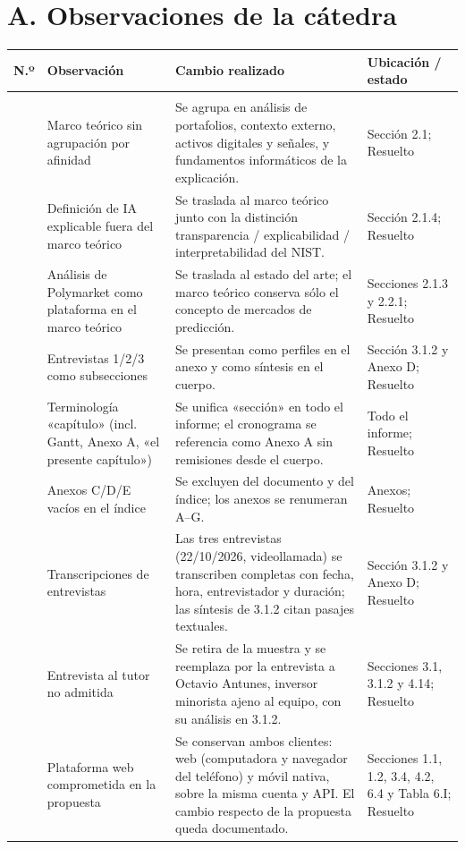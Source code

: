 \documentclass[a4paper,11pt]{article}
\newcommand{\ok}{\textcolor{green!45!black}{Resuelto}}
\begin{document}
\section*{A. Observaciones de la cátedra}
\small
\begin{longtable}{>{\raggedright\arraybackslash}p{0.6cm}>{\raggedright\arraybackslash}p{5.2cm}>{\raggedright\arraybackslash}p{7.3cm}>{\raggedright\arraybackslash}p{3.4cm}}
\toprule
\textbf{N.º} & \textbf{Observación} & \textbf{Cambio realizado} & \textbf{Ubicación / estado}\\\midrule
\endhead
\multicolumn{4}{l}{\textit{Estructura}}\\
1 & Marco teórico sin agrupación por afinidad & Se agrupa en análisis de portafolios, contexto externo, activos digitales y señales, y fundamentos informáticos de la explicación. & Sección 2.1; \ok\\
2 & Definición de IA explicable fuera del marco teórico & Se traslada al marco teórico junto con la distinción transparencia / explicabilidad / interpretabilidad del NIST. & Sección 2.1.4; \ok\\
3 & Análisis de Polymarket como plataforma en el marco teórico & Se traslada al estado del arte; el marco teórico conserva sólo el concepto de mercados de predicción. & Secciones 2.1.3 y 2.2.1; \ok\\
4 & Entrevistas 1/2/3 como subsecciones & Se presentan como perfiles en el anexo y como síntesis en el cuerpo. & Sección 3.1.2 y Anexo D; \ok\\
5 & Terminología «capítulo» (incl. Gantt, Anexo A, «el presente capítulo») & Se unifica «sección» en todo el informe; el cronograma se referencia como Anexo A sin remisiones desde el cuerpo. & Todo el informe; \ok\\
6 & Anexos C/D/E vacíos en el índice & Se excluyen del documento y del índice; los anexos se renumeran A--G. & Anexos; \ok\\
7 & Transcripciones de entrevistas & Las tres entrevistas (22/10/2026, videollamada) se transcriben completas con fecha, hora, entrevistador y duración; las síntesis de 3.1.2 citan pasajes textuales. & Sección 3.1.2 y Anexo D; \ok\\
8 & Entrevista al tutor no admitida & Se retira de la muestra y se reemplaza por la entrevista a Octavio Antunes, inversor minorista ajeno al equipo, con su análisis en 3.1.2. & Secciones 3.1, 3.1.2 y 4.14; \ok\\
9 & Plataforma web comprometida en la propuesta & Se conservan ambos clientes: web (computadora y navegador del teléfono) y móvil nativa, sobre la misma cuenta y API. El cambio respecto de la propuesta queda documentado. & Secciones 1.1, 1.2, 3.4, 4.2, 6.4 y Tabla 6.I; \ok\\

\end{longtable}
\end{document}
